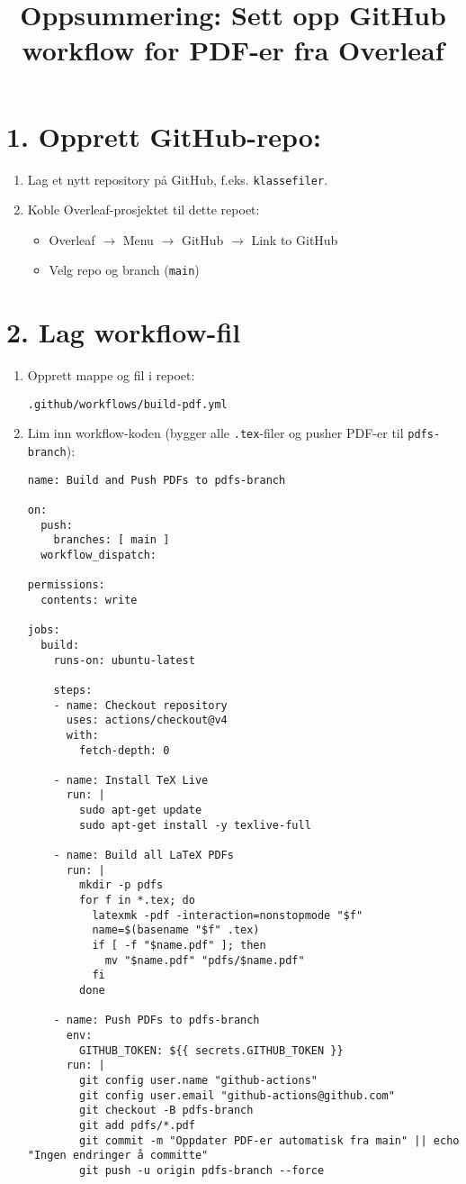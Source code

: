 \documentclass[a4paper,12pt]{article}
\title{Oppsummering: Sett opp GitHub workflow for PDF-er fra Overleaf}
\author{}
\date{}
\begin{document}
\maketitle

\section*{1. Opprett GitHub-repo:}
\begin{enumerate}[label=\arabic*.]
    \item Lag et nytt repository på GitHub, f.eks. \texttt{klassefiler}.
    \item Koble Overleaf-prosjektet til dette repoet:
    \begin{itemize}
        \item Overleaf $\to$ Menu $\to$ GitHub $\to$ Link to GitHub
        \item Velg repo og branch (\texttt{main})
    \end{itemize}
\end{enumerate}

\section*{2. Lag workflow-fil}
\begin{enumerate}[label=\arabic*.]
    \item Opprett mappe og fil i repoet:
    \begin{verbatim}
.github/workflows/build-pdf.yml
    \end{verbatim}
    \item Lim inn workflow-koden (bygger alle \texttt{.tex}-filer og pusher PDF-er til \texttt{pdfs-branch}):
    \begin{verbatim}
name: Build and Push PDFs to pdfs-branch

on:
  push:
    branches: [ main ]
  workflow_dispatch:

permissions:
  contents: write

jobs:
  build:
    runs-on: ubuntu-latest

    steps:
    - name: Checkout repository
      uses: actions/checkout@v4
      with:
        fetch-depth: 0

    - name: Install TeX Live
      run: |
        sudo apt-get update
        sudo apt-get install -y texlive-full

    - name: Build all LaTeX PDFs
      run: |
        mkdir -p pdfs
        for f in *.tex; do
          latexmk -pdf -interaction=nonstopmode "$f"
          name=$(basename "$f" .tex)
          if [ -f "$name.pdf" ]; then
            mv "$name.pdf" "pdfs/$name.pdf"
          fi
        done

    - name: Push PDFs to pdfs-branch
      env:
        GITHUB_TOKEN: ${{ secrets.GITHUB_TOKEN }}
      run: |
        git config user.name "github-actions"
        git config user.email "github-actions@github.com"
        git checkout -B pdfs-branch
        git add pdfs/*.pdf
        git commit -m "Oppdater PDF-er automatisk fra main" || echo "Ingen endringer å committe"
        git push -u origin pdfs-branch --force
    \end{verbatim}
\end{enumerate}
\end{document}
